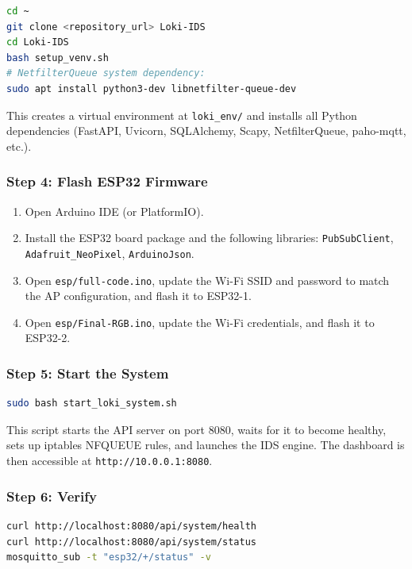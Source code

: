 \documentclass[12pt,a4paper]{article}
\begin{document}
\begin{lstlisting}[language=bash]
cd ~
git clone <repository_url> Loki-IDS
cd Loki-IDS
bash setup_venv.sh
# NetfilterQueue system dependency:
sudo apt install python3-dev libnetfilter-queue-dev
\end{lstlisting}

This creates a virtual environment at \texttt{loki\_env/} and installs all Python dependencies (FastAPI, Uvicorn, SQLAlchemy, Scapy, NetfilterQueue, paho-mqtt, etc.).

\subsubsection*{Step 4: Flash ESP32 Firmware}

\begin{enumerate}
    \item Open Arduino IDE (or PlatformIO).
    \item Install the ESP32 board package and the following libraries: \texttt{PubSubClient}, \texttt{Adafruit\_NeoPixel}, \texttt{ArduinoJson}.
    \item Open \texttt{esp/full-code.ino}, update the Wi-Fi SSID and password to match the AP configuration, and flash it to ESP32-1.
    \item Open \texttt{esp/Final-RGB.ino}, update the Wi-Fi credentials, and flash it to ESP32-2.
\end{enumerate}

\subsubsection*{Step 5: Start the System}

\begin{lstlisting}[language=bash]
sudo bash start_loki_system.sh
\end{lstlisting}

This script starts the API server on port 8080, waits for it to become healthy, sets up iptables NFQUEUE rules, and launches the IDS engine. The dashboard is then accessible at \texttt{http://10.0.0.1:8080}.

\subsubsection*{Step 6: Verify}

\begin{lstlisting}[language=bash]
curl http://localhost:8080/api/system/health
curl http://localhost:8080/api/system/status
mosquitto_sub -t "esp32/+/status" -v
\end{lstlisting}
\end{document}
